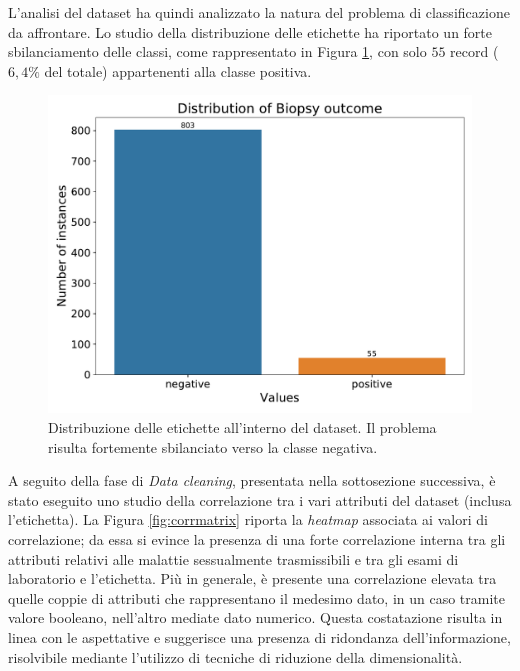 L'analisi del dataset ha quindi analizzato la natura del problema di classificazione da affrontare. Lo studio della distribuzione delle etichette ha riportato un forte sbilanciamento delle classi, come rappresentato in Figura \ref{fig:biopsydistribution}, con solo $55$ record ($6,4\%$ del totale) appartenenti alla classe positiva.
\begin{figure}
	\centering
	\includegraphics[width=1\linewidth]{images/biopsy_distribution}
	\caption{Distribuzione delle etichette all'interno del dataset. Il problema risulta fortemente sbilanciato verso la classe negativa.}
	\label{fig:biopsydistribution}
\end{figure}
A seguito della fase di \textit{Data cleaning}, presentata nella sottosezione successiva, è stato eseguito uno studio della correlazione tra i vari attributi del dataset (inclusa l'etichetta). La Figura \ref{fig:corrmatrix} riporta la \textit{heatmap} associata ai valori di correlazione; da essa si evince la presenza di una forte correlazione interna tra gli attributi relativi alle malattie sessualmente trasmissibili e tra gli esami di laboratorio e l'etichetta. Più in generale, è presente una correlazione elevata tra quelle coppie di attributi che rappresentano il medesimo dato, in un caso tramite valore booleano, nell'altro mediate dato numerico. Questa costatazione risulta in linea con le aspettative e suggerisce una presenza di ridondanza dell'informazione, risolvibile mediante l'utilizzo di tecniche di riduzione della dimensionalità.
